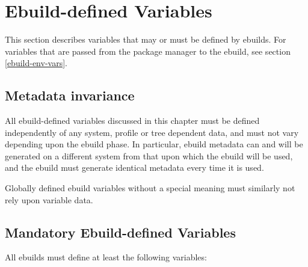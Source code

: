 \chapter{Ebuild-defined Variables}
\label{ebuild-vars}

\note This section describes variables that may or must be defined by ebuilds. For
variables that are passed from the package manager to the ebuild, see section \ref{ebuild-env-vars}.

\section{Metadata invariance}
\label{metadata-invariance}

All ebuild-defined variables discussed in this chapter must be defined independently of
any system, profile or tree dependent data, and must not vary depending upon the ebuild
phase. In particular, ebuild metadata can and will be generated on a different system from that upon
which the ebuild will be used, and the ebuild must generate identical metadata every time it
is used.

Globally defined ebuild variables without a special meaning must similarly not rely upon
variable data.


\section{Mandatory Ebuild-defined Variables}

All ebuilds must define at least the following variables:

